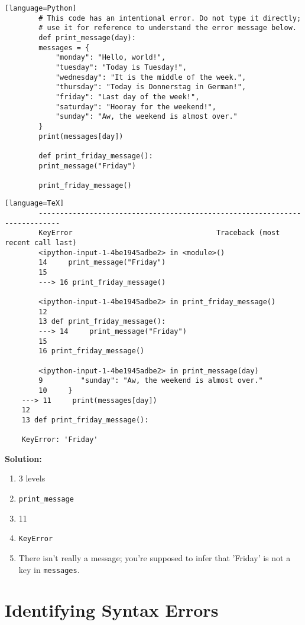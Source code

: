 \documentclass{article}
\begin{document}
	\begin{verbatim}[language=Python]
		# This code has an intentional error. Do not type it directly;
		# use it for reference to understand the error message below.
		def print_message(day):
		messages = {
			"monday": "Hello, world!",
			"tuesday": "Today is Tuesday!",
			"wednesday": "It is the middle of the week.",
			"thursday": "Today is Donnerstag in German!",
			"friday": "Last day of the week!",
			"saturday": "Hooray for the weekend!",
			"sunday": "Aw, the weekend is almost over."
		}
		print(messages[day])
		
		def print_friday_message():
		print_message("Friday")
		
		print_friday_message()
	\end{verbatim}
	
	\begin{verbatim}[language=TeX]
		---------------------------------------------------------------------------
		KeyError                                  Traceback (most recent call last)
		<ipython-input-1-4be1945adbe2> in <module>()
		14     print_message("Friday")
		15 
		---> 16 print_friday_message()
		
		<ipython-input-1-4be1945adbe2> in print_friday_message()
		12 
		13 def print_friday_message():
		---> 14     print_message("Friday")
		15 
		16 print_friday_message()
		
		<ipython-input-1-4be1945adbe2> in print_message(day)
		9         "sunday": "Aw, the weekend is almost over."
		10     }
	---> 11     print(messages[day])
	12 
	13 def print_friday_message():
	
	KeyError: 'Friday'
	\end{verbatim}
	
	\textbf{Solution:}
	
	\begin{enumerate}
	\item 3 levels
	\item \texttt{print\_message}
	\item 11
	\item \texttt{KeyError}
	\item There isn't really a message; you're supposed to infer that 'Friday' is not a key in \texttt{messages}.
	\end{enumerate}
	
	\section{Identifying Syntax Errors}
	
\end{document}
